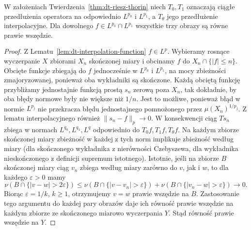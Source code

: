 \begin{wniosek}
\label{cor:dt-interpolation-compatible}
W założeniach Twierdzenia~\ref{thm:dt-riesz-thorin}
niech $T_0,T_1$ oznaczają ciągłe przedłużenia operatora
na odpowiednio $L^{p_0}$ i $L^{p_1}$, a $T_\theta$
jego przedłużenie interpolacyjne. Dla dowolnego
$f\in L^{p_0}\cap L^{p_1}$ wszystkie trzy obrazy
są równe prawie wszędzie.
\end{wniosek}
\begin{proof}
Z Lematu~\ref{lem:dt-interpolation-function}
$f\in L^p$. Wybieramy rosnące wyczerpanie $X$
zbiorami $X_n$ skończonej miary i obcinamy $f$
do $X_n\cap\{|f|\le n\}$. Obcięte funkcje zbiegają
do $f$ jednocześnie w $L^{p_0}$ i $L^{p_1}$,
na mocy zbieżności zmajoryzowanej, ponieważ oba
wykładniki są skończone. Każdą obciętą funkcję
przybliżamy jednostajnie funkcją prostą $s_n$ zerową
poza $X_n$, tak dokładnie, by oba błędy normowe
były nie większe niż $1/n$. Jest to możliwe, ponieważ
błąd w normie $L^{p_j}$ nie przekracza błędu
jednostajnego pomnożonego przez $\mu(X_n)^{1/p_j}$.
Z lematu interpolacyjnego również $\|s_n-f\|_p\to0$.
W konsekwencji ciąg $Ts_n$ zbiega w normach
$L^{q_0},L^{q_1},L^q$ odpowiednio do
$T_0f,T_1f,T_\theta f$.
Na każdym zbiorze skończonej miary zbieżność w każdej
z tych norm implikuje zbieżność według miary
(dla skończonego wykładnika z nierówności Czebyszewa,
dla wykładnika nieskończonego z definicji supremum
istotnego). Istotnie, jeśli na zbiorze $B$ skończonej miary
ciąg $v_n$ zbiega według miary zarówno do $v$, jak i $w$,
to dla każdego $\varepsilon>0$ mamy
\[
 \nu(B\cap\{|v-w|>2\varepsilon\})
 \le \nu(B\cap\{|v-v_n|>\varepsilon\})
 +\nu(B\cap\{|v_n-w|>\varepsilon\})\longrightarrow0.
\]
Biorąc $\varepsilon=1/k$, $k\ge1$, otrzymujemy $v=w$
prawie wszędzie na $B$. Zastosowanie tego argumentu
do każdej pary obrazów daje ich równość prawie wszędzie
na każdym zbiorze ze skończonego miarowo wyczerpania $Y$.
Stąd równość prawie wszędzie na $Y$.
\end{proof}


